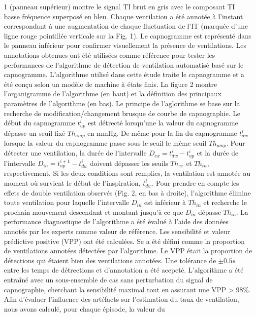 \documentclass[12pt,]{article}
\begin{document}
1 (panneau supérieur) montre le signal TI brut en gris avec le composant
TI basse fréquence superposé en bleu. Chaque ventilation a été annotée à
l'instant correspondant à une augmentation de chaque fluctuation de l'IT
(marquée d'une ligne rouge pointillée verticale sur la Fig. 1). Le
capnogramme est représenté dans le panneau inférieur pour confirmer
visuellement la présence de ventilations. Les annotations obtenues ont
été utilisées comme référence pour tester les performances de
l'algorithme de détection de ventilation automatisé basé sur le
capnogramme. L'algorithme utilisé dans cette étude traite le capnogramme
et a été conçu selon un modèle de machine à états finis. La figure 2
montre l'organigramme de l'algorithme (en haut) et la définition des
principaux paramètres de l'algorithme (en bas). Le principe de
l'aglorithme se base sur la recherche de modification/changement brusque
de courbe de capnographie. Le début du capnogramme \(t_{up}^{i}\) est
détrecté lorsqu'une la valeur du capnogramme dépasse un seuil fixé
\(Th_{amp}\) en mmHg. De même pour la fin du capnogramme \(t_{dw}^{i}\)
lorsque la valeur du capnogramme passe sous le seuil le même seuil
\(Th_{amp}\). Pour détecter une ventilation, la durée de l'intervalle
\(D_{ex}=t_{dw}^{i}-t_{up}^{i}\) et la durée de l'intervalle
\(D_{in}=t_{up}^{i+1}-t_{dw}^{i}\) doivent dépasser les seuils
\(Th_{ex}\) et \(Th_{in}\), respectivement. Si les deux conditions sont
remplies, la ventilation est annotée au moment où survient le début de
l'inspiration, \(t_{dw}^{i}\). Pour prendre en compte les effets de
double ventilation observés (Fig. 2, en bas à droite), l'algorithme
élimine toute ventilation pour laquelle l'intervalle \(D_{in}\) est
inférieur à \(Th_{in}\) et recherche le prochain mouvement descendant et
montant jusqu'à ce que \(D_{in}\) dépasse \(Th_{in}\). La performance
diagnostique de l'algorithme a été évalué à l'aide des données annotés
par les experts comme valeur de référence. Les sensibilité et valeur
prédictive positive (VPP) ont été calculées. Se a été défini comme la
proportion de ventilations annotées détectées par l'algorithme. Le VPP
était la proportion de détections qui étaient bien des ventilations
annotées. Une tolérance de \(\pm0.5s\) entre les temps de détrections et
d'annotation a été accpeté. L'algorithme a été entraîné avec un
sous-ensemble de cas sans perturbation du signal de capnographie,
cherchant la sensibilité maximal tout en assurant une VPP \textgreater{}
98\%. Afin d'évaluer l'influence des artéfacts sur l'estimation du taux
de ventilation, nous avons calculé, pour chaque épisode, la valeur du
\end{document}
